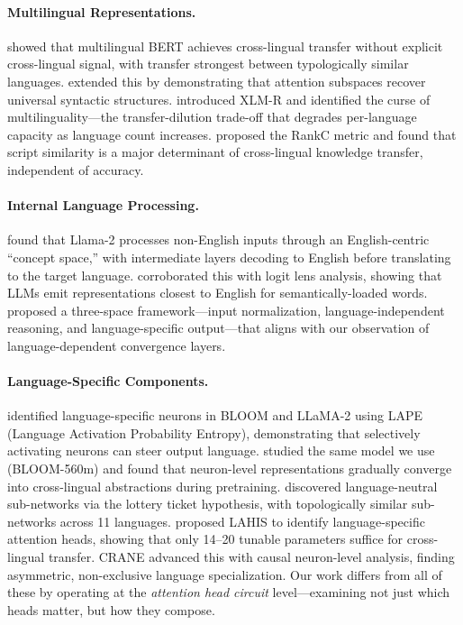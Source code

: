 \documentclass[11pt]{article}
\begin{document}
\paragraph{Multilingual Representations.}
\citet{pires2019multilingual} showed that multilingual BERT achieves cross-lingual transfer without explicit cross-lingual signal, with transfer strongest between typologically similar languages.
\citet{chi2020finding} extended this by demonstrating that attention subspaces recover universal syntactic structures.
\citet{conneau2020unsupervised} introduced XLM-R and identified the curse of multilinguality---the transfer-dilution trade-off that degrades per-language capacity as language count increases.
\citet{qi2023crosslingual} proposed the RankC metric and found that script similarity is a major determinant of cross-lingual knowledge transfer, independent of accuracy.

\paragraph{Internal Language Processing.}
\citet{wendler2024llamas} found that Llama-2 processes non-English inputs through an English-centric ``concept space,'' with intermediate layers decoding to English before translating to the target language.
\citet{schut2025multilingual} corroborated this with logit lens analysis, showing that LLMs emit representations closest to English for semantically-loaded words.
\citet{zhao2024crosslingual} proposed a three-space framework---input normalization, language-independent reasoning, and language-specific output---that aligns with our observation of language-dependent convergence layers.

\paragraph{Language-Specific Components.}
\citet{tang2024language} identified language-specific neurons in BLOOM and LLaMA-2 using LAPE (Language Activation Probability Entropy), demonstrating that selectively activating neurons can steer output language.
\citet{riemenschneider2025crosslingual} studied the same model we use (BLOOM-560m) and found that neuron-level representations gradually converge into cross-lingual abstractions during pretraining.
\citet{foroutan2022discovering} discovered language-neutral sub-networks via the lottery ticket hypothesis, with topologically similar sub-networks across 11 languages.
\citet{chen2025focusing} proposed LAHIS to identify language-specific attention heads, showing that only 14--20 tunable parameters suffice for cross-lingual transfer.
CRANE \citeyearpar{crane2026causal} advanced this with causal neuron-level analysis, finding asymmetric, non-exclusive language specialization.
Our work differs from all of these by operating at the \emph{attention head circuit} level---examining not just which heads matter, but how they compose.
\end{document}

